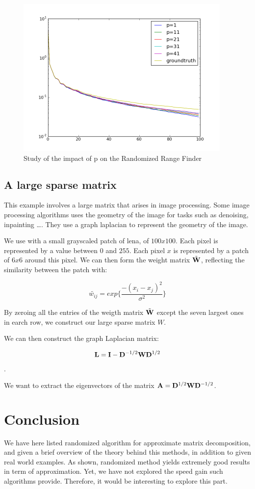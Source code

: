 \documentclass[onecolumn,12pt]{article}
\begin{document}
\begin{figure}[h]
\label{rrf-different-p}
\caption{Study of the impact of p on the Randomized Range Finder}
\includegraphics[width=400px]{./images/l_va.png}
\end{figure}


\subsection{A large sparse matrix}

This example involves a large matrix that arises in image processing. Some
image processing algorithms uses the geometry of the image for tasks such as
denoising, inpainting \dots. They use a graph laplacian to represent the
geometry of the image.

We use with a small grayscaled patch of lena, of $100 x 100$. Each pixel is
represented by a value between $0$ and $255$. Each pixel $x$ is represented by
a patch of $6x6$ around this pixel. We can then form the weight matrix
$\tilde{\bold{W}}$, reflecting the similarity between the patch with:

$$\tilde{w_{ij}} = exp \{ \frac{- (x_i - x_j)^2}{\sigma^2}\}$$

By zeroing all the entries of the weigth matrix $\tilde{\bold{W}}$ except the seven
largest ones in earch row, we construct our large sparse matrix $W$.

We can then construct the graph Laplacian matrix:

$$\bold{L} = \bold{I} - \bold{D}^{-1/2} \bold{W} \bold{D}^{1/2}$$.

We want to extract the eigenvectors of the matrix
$\bold{A}= \bold{D}^{1/2} \bold{W} \bold{D}^{-1/2}$.

\section{Conclusion}

We have here listed randomized algorithm for approximate matrix decomposition,
and given a brief overview of the theory behind this methods, in addition to
given real world examples. As shown, randomized method yields extremely good
results in term of approximation. Yet, we have not explored the speed gain
such algorithms provide. Therefore, it would be interesting to explore this
part.


\end{document}
